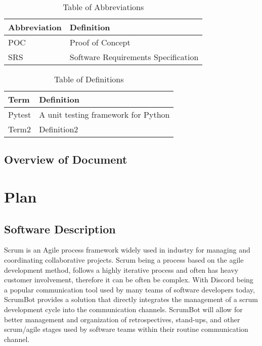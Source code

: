 \documentclass[12pt, titlepage]{article}
\begin{document}
\begin{table}[hbp]
    \caption{Table of Abbreviations}
    \label{Table}
    \begin{tabularx}{\textwidth}{p{3cm}X}
        \toprule
        \textbf{Abbreviation} & \textbf{Definition} \\
        \midrule
        POC & Proof of Concept\\
        SRS & Software Requirements Specification\\
        \bottomrule
    \end{tabularx}
\end{table}

\begin{table}[!htbp]
    \caption{Table of Definitions}
    \label{Table}
    \begin{tabularx}{\textwidth}{p{3cm}X}
        \toprule
        \textbf{Term} & \textbf{Definition}\\
        \midrule
        Pytest & A unit testing framework for Python\\
        Term2 & Definition2\\
        \bottomrule
    \end{tabularx}
\end{table} 

\subsection{Overview of Document}

\section{Plan}
\subsection{Software Description}
Scrum is an Agile process framework widely used in industry for managing and coordinating collaborative projects. Scrum being a process based on the agile development method, follows a highly iterative process and often has heavy customer involvement, therefore it can be often be complex. With Discord being a popular communication tool used by many teams of software developers today, ScrumBot provides a solution that directly integrates the management of a scrum development cycle into the communication channels. ScrumBot will allow for better management and organization of retrospectives, stand-ups, and other scrum/agile stages used by software teams within their routine communication channel.
\end{document}
